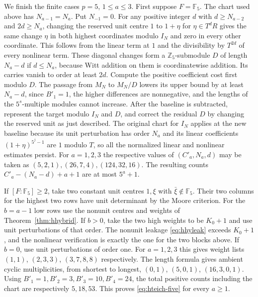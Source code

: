 \documentclass[11pt,letterpaper]{article}
\theoremstyle{definition}
\numberwithin{equation}{section}
\begin{document}
We finish the finite cases $p=5$, $1\le a\le3$. First suppose $F=\mathbb F_5$.
The chart used above has $N_{a-1}=N_a$. Put $N_{-1}=0$. For any positive integer $d$ with
$d\ge N_{a-2}$ and $2d\ge N_a$, changing the reserved unit centre
$1$ to $1+\eta$ for $\eta\in T^dR$ gives the same change $\eta$
in both highest coordinates modulo $I_N$ and zero in every other
coordinate. This follows from the linear term at $1$ and the
divisibility by $T^{2d}$ of every nonlinear term.
These diagonal changes form a $\mathbb Z_5$-submodule $D$
of length $N_a-d$ if $d\le N_a$, because Witt addition on them is
coordinatewise addition. Its carries vanish to order at least $2d$. Compute the positive coefficient cost first modulo $D$.
The passage from $M_N$ to $M_N/D$ lowers its upper bound by at
least $N_a-d$, since $B'_1=1$, the higher differences are nonnegative,
and the lengths of the $5^s$-multiple modules cannot increase.
After the baseline is subtracted, represent the target modulo
$I_N$ and $D$, and correct the residual $D$ by changing the reserved
unit as just described. The original chart for $I_N$ applies at
the new baseline because its unit perturbation has order $N_a$ and
its linear coefficients $(1+\eta)^{5^j-1}$ are $1$ modulo $T$,
so all the normalized linear and nonlinear estimates persist.
For $a=1,2,3$ the respective values of $(C'_a,N_a,d)$ may be taken as
$(5,2,1),(26,7,4),(124,32,16)$. The resulting counts
$C'_a-(N_a-d)+a+1$ are at most $5^a+1$.

If $[F:\mathbb F_5]\ge2$, take two constant unit centres $1,\xi$
with $\bar\xi\notin\mathbb F_5$. Their two columns for the highest
two rows have unit determinant by the Moore criterion. For the
$b=a-1$ low rows use the nonunit centres and weights of
Theorem~\ref{thm:hhybrid}. If $b>0$, take the two high weights
to be $K_0+1$ and use unit perturbations of that order. The
nonunit leakage \eqref{eq:hhyleak} exceeds $K_0+1$, and the
nonlinear verification is exactly the one for the two blocks
above. If $b=0$, use unit perturbations of order one.
For $a=1,2,3$ this gives weight lists $(1,1)$, $(2,3,3)$,
$(3,7,8,8)$ respectively. The length formula gives ambient cyclic
multiplicities, from shortest to longest,
$(0,1)$, $(5,0,1)$, $(16,3,0,1)$. Using $B'_1=1,B'_2=3,
B'_3=10,B'_4=24$, the total positive counts including the chart
are respectively $5,18,53$. This proves
\eqref{eq:hteich-five} for every $a\ge1$.
\end{document}
